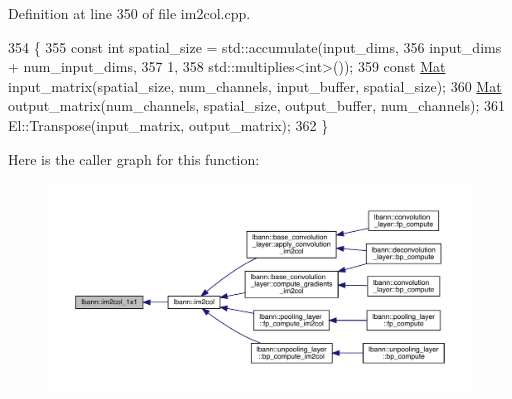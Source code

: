 Definition at line 350 of file im2col.\+cpp.


\begin{DoxyCode}
354                                         \{
355   \textcolor{keyword}{const} \textcolor{keywordtype}{int} spatial\_size = std::accumulate(input\_dims,
356                                            input\_dims + num\_input\_dims,
357                                            1,
358                                            std::multiplies<int>());
359   \textcolor{keyword}{const} \hyperlink{base_8hpp_a68f11fdc31b62516cb310831bbe54d73}{Mat} input\_matrix(spatial\_size, num\_channels, input\_buffer, spatial\_size);
360   \hyperlink{base_8hpp_a68f11fdc31b62516cb310831bbe54d73}{Mat} output\_matrix(num\_channels, spatial\_size, output\_buffer, num\_channels);
361   El::Transpose(input\_matrix, output\_matrix);
362 \}
\end{DoxyCode}
Here is the caller graph for this function\+:\nopagebreak
\begin{figure}[H]
\begin{center}
\leavevmode
\includegraphics[width=350pt]{namespacelbann_a3d099edd7d1b09889e0d2133bb83d5bf_icgraph}
\end{center}
\end{figure}
\mbox{\label{namespacelbann_adc05d10657be77ccd9a74b1621c416c3}} 
